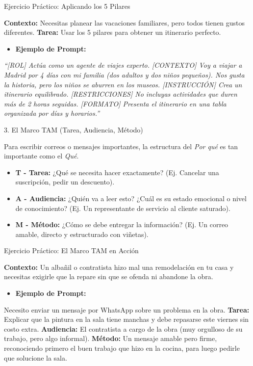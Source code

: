 \documentclass[aspectratio=169]{beamer}
\begin{document}
\begin{frame}[fragile]{Ejercicio Práctico: Aplicando los 5 Pilares}


\textbf{Contexto:} Necesitas planear las vacaciones familiares, pero todos tienen gustos diferentes.
\textbf{Tarea:} Usar los 5 pilares para obtener un itinerario perfecto.

\begin{itemize}
  \item \textbf{Ejemplo de Prompt:}
\end{itemize}
\textit{``[ROL] Actúa como un agente de viajes experto. [CONTEXTO] Voy a viajar a Madrid por 4 días con mi familia (dos adultos y dos niños pequeños). Nos gusta la historia, pero los niños se aburren en los museos. [INSTRUCCIÓN] Crea un itinerario equilibrado. [RESTRICCIONES] No incluyas actividades que duren más de 2 horas seguidas. [FORMATO] Presenta el itinerario en una tabla organizada por días y horarios.''}

\end{frame}



\begin{frame}[fragile]{3. El Marco TAM (Tarea, Audiencia, Método)}


Para escribir correos o mensajes importantes, la estructura del \textit{Por qué} es tan importante como el \textit{Qué}.

\begin{itemize}
  \item \textbf{T - Tarea:} ¿Qué se necesita hacer exactamente? (Ej. Cancelar una suscripción, pedir un descuento).
  \item \textbf{A - Audiencia:} ¿Quién va a leer esto? ¿Cuál es su estado emocional o nivel de conocimiento? (Ej. Un representante de servicio al cliente saturado).
  \item \textbf{M - Método:} ¿Cómo se debe entregar la información? (Ej. Un correo amable, directo y estructurado con viñetas).
\end{itemize}
\end{frame}



\begin{frame}[fragile]{Ejercicio Práctico: El Marco TAM en Acción}


\textbf{Contexto:} Un albañil o contratista hizo mal una remodelación en tu casa y necesitas exigirle que la repare sin que se ofenda ni abandone la obra.

\begin{itemize}
  \item \textbf{Ejemplo de Prompt:}
\end{itemize}
Necesito enviar un mensaje por WhatsApp sobre un problema en la obra.
\textbf{Tarea:} Explicar que la pintura en la sala tiene manchas y debe repasarse este viernes sin costo extra.
\textbf{Audiencia:} El contratista a cargo de la obra (muy orgulloso de su trabajo, pero algo informal).
\textbf{Método:} Un mensaje amable pero firme, reconociendo primero el buen trabajo que hizo en la cocina, para luego pedirle que solucione la sala.

\end{frame}
\end{document}
